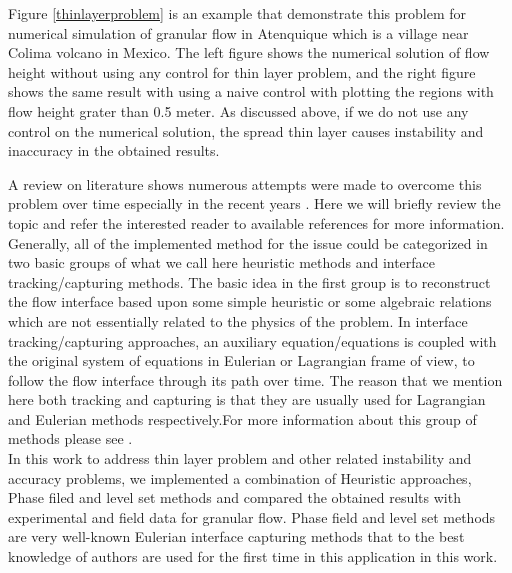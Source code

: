 \documentclass[letterpaper,10pt]{article}
\begin{document}
Figure \ref{thinlayerproblem} is an example that demonstrate this problem for numerical simulation of granular flow in  Atenquique which is a village near Colima volcano in Mexico. The left figure shows the numerical solution of flow height without using any control for thin layer problem, and the right figure shows the same result with using a naive control with plotting the regions with flow height grater than 0.5 meter. As discussed above, if we do not use any control on the numerical solution, the spread thin layer causes instability and inaccuracy in the obtained results.

A review on literature shows numerous attempts were made to overcome this problem over time especially in the recent years \cite{Medeiros2013,Balzano1998,Aureli2008,Bunya2009,Casulli2009a,Kesserwani2011,DAlpaos2007,Castro2005a} .
Here we will briefly review the topic and refer the interested reader to available references for more information. \newline
Generally, all of the implemented method for the issue could be 
categorized in two basic groups of what we call here heuristic methods and interface tracking/capturing methods.
The basic idea in the first group is to reconstruct the flow interface based upon 
some simple heuristic or some algebraic relations which are not essentially related
to the physics of the problem. In interface tracking/capturing approaches, an auxiliary equation/equations is coupled with the original system of equations in Eulerian or Lagrangian frame of view, to follow the flow interface through its path over time. 
The reason that we mention here both tracking and capturing is that they are usually used for Lagrangian and Eulerian methods respectively.For more information about this group of methods please see \cite{Glimm1995,Unverdi1992,Osher1988,Anderson1998,hirt1981vfv}.\\
In this work to address thin layer problem and other related instability and accuracy problems, we implemented a combination of Heuristic approaches, Phase filed and level set methods and compared the obtained results with experimental and field data for granular flow. Phase field and level set methods are very well-known Eulerian interface capturing methods that to the best knowledge of authors are used for the first time in this application in this work. \\
\end{document}
